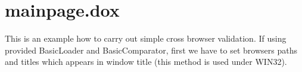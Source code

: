 \hypertarget{mainpage_8dox-example}{\section{mainpage.\-dox}
}
This is an example how to carry out simple cross browser validation. If using provided Basic\-Loader and Basic\-Comparator, first we have to set browsers paths and titles which appears in window title (this method is used under W\-I\-N32).


\begin{DoxyCodeInclude}
\end{DoxyCodeInclude}
 